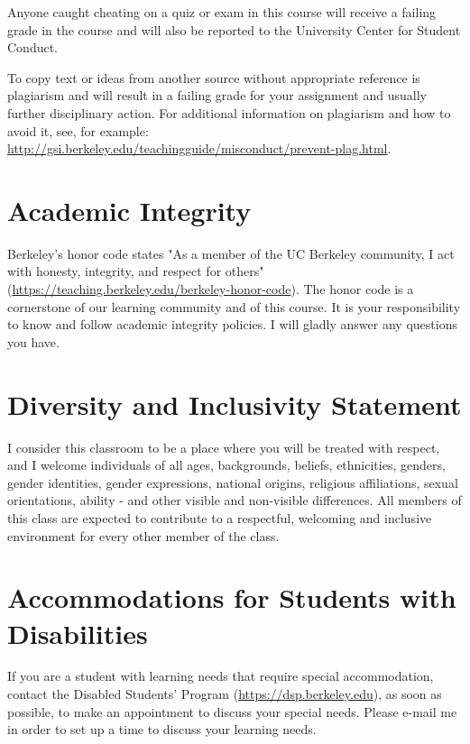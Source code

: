 \documentclass[letterpaper]{inzane_syllabus} %
\begin{document}
Anyone caught cheating on a quiz or exam in this course will receive a failing grade in the course and will also be reported to the University Center for Student Conduct.

To copy text or ideas from another source without appropriate reference is plagiarism and will result in a failing grade for your assignment and usually further disciplinary action. For additional information on plagiarism and how to avoid it, see, for
example: \url{http://gsi.berkeley.edu/teachingguide/misconduct/prevent-plag.html}.

\vspace{0.5cm}
\section{Academic Integrity}

Berkeley's honor code states "As a member of the UC Berkeley community, I act with honesty, integrity, and respect for others" (\url{https://teaching.berkeley.edu/berkeley-honor-code}). The honor code is a cornerstone of our learning community and of this course. It is your responsibility to know and follow academic integrity policies. I will gladly answer any questions you have.\\

\vspace{0.5cm}
\section{Diversity and Inclusivity Statement}

I consider this classroom to be a place where you will be treated with respect, and I welcome individuals of all ages, backgrounds, beliefs, ethnicities, genders, gender identities, gender expressions, national origins, religious affiliations, sexual orientations, ability - and other visible and non-visible differences. All members of this class are expected to contribute to a respectful, welcoming and inclusive environment for every other member of the class. 

\vspace{0.5cm}
\section{Accommodations for Students with Disabilities}

If you are a student with learning needs that require special accommodation, contact the Disabled Students' Program (\url{https://dsp.berkeley.edu}), as soon as possible, to make an appointment to discuss your special needs.  Please e-mail me in order to set up a time to discuss your learning needs.
\end{document}

